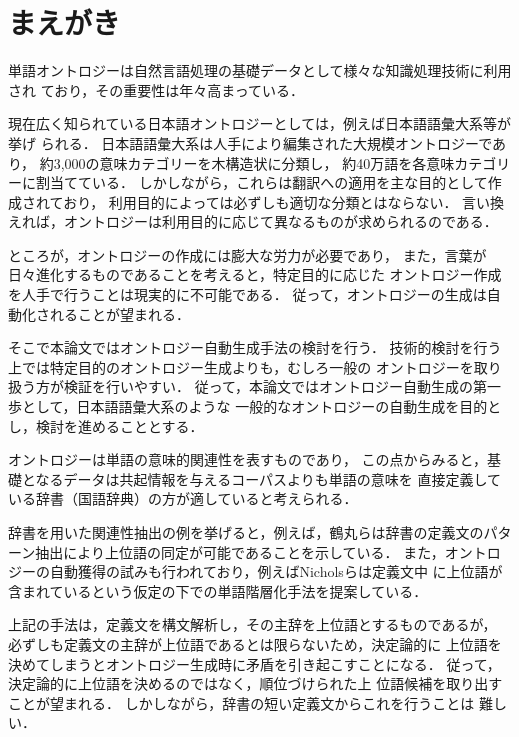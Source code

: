 \documentclass[japanese]{jnlp_1.4}
\begin{document}
\maketitle


\section{まえがき}
\label{sec:intro}

単語オントロジーは自然言語処理の基礎データとして様々な知識処理技術に利用され
ており，その重要性は年々高まっている． 


現在広く知られている日本語オントロジーとしては，例えば日本語語彙大系\cite{goitaikeij}等が挙げ
られる．
日本語語彙大系は人手により編集された大規模オントロジーであり，
約3,000の意味カテゴリーを木構造状に分類し，
約40万語を各意味カテゴリーに割当てている．
しかしながら，これらは翻訳への適用を主な目的として作成されており，
利用目的によっては必ずしも適切な分類とはならない．
言い換えれば，オントロジーは利用目的に応じて異なるものが求められるのである．

ところが，オントロジーの作成には膨大な労力が必要であり，
また，言葉が日々進化するものであることを考えると，特定目的に応じた
オントロジー作成を人手で行うことは現実的に不可能である．
従って，オントロジーの生成は自動化されることが望まれる．

 そこで本論文ではオントロジー自動生成手法の検討を行う．
技術的検討を行う上では特定目的のオントロジー生成よりも，むしろ一般の
オントロジーを取り扱う方が検証を行いやすい．
従って，本論文ではオントロジー自動生成の第一歩として，日本語語彙大系のような
一般的なオントロジーの自動生成を目的とし，検討を進めることとする．

オントロジーは単語の意味的関連性を表すものであり，
この点からみると，基礎となるデータは共起情報を与えるコーパスよりも単語の意味を
直接定義している辞書（国語辞典）の方が適していると考えられる．

辞書を用いた関連性抽出の例を挙げると，例えば，鶴丸らは辞書の定義文のパターン抽出により上位語の同定が可能であることを示している\cite{tsurumaru1991}．
また，オントロジーの自動獲得の試みも行われており，例えばNicholsらは定義文中
に上位語が含まれているという仮定の下での単語階層化手法を提案している\cite{Nichols:Bond:2005}．

上記の手法は，定義文を構文解析し，その主辞を上位語とするものであるが，
必ずしも定義文の主辞が上位語であるとは限らないため，決定論的に
上位語を決めてしまうとオントロジー生成時に矛盾を引き起こすことになる．
従って，決定論的に上位語を決めるのではなく，順位づけられた上
位語候補を取り出すことが望まれる．
しかしながら，辞書の短い定義文からこれを行うことは
難しい．
\end{document}

